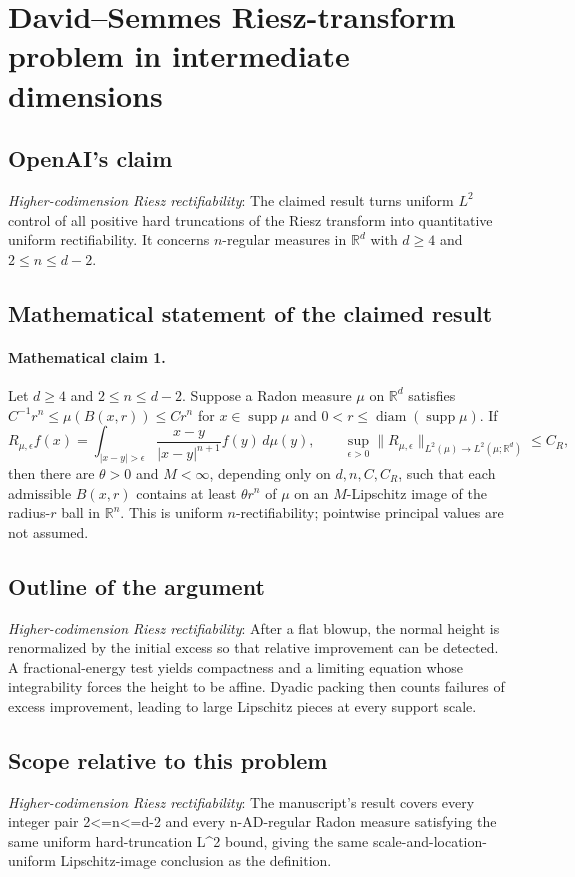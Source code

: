 \documentclass[11pt]{article}
\begin{document}
\section*{David–Semmes Riesz-transform problem in intermediate dimensions}

\subsection{OpenAI's claim}
\textit{Higher-codimension Riesz rectifiability}: The claimed result turns uniform $L^2$ control of all positive hard truncations of the Riesz transform into quantitative uniform rectifiability. It concerns $n$-regular measures in $\mathbb R^d$ with $d\ge4$ and $2\le n\le d-2$.

\subsection{Mathematical statement of the claimed result}
\paragraph{Mathematical claim 1.} Let $d\ge4$ and $2\le n\le d-2$. Suppose a Radon measure $\mu$ on $\mathbb R^d$ satisfies $C^{-1}r^n\le\mu(B(x,r))\le Cr^n$ for $x\in\operatorname{supp}\mu$ and $0<r\le\operatorname{diam}(\operatorname{supp}\mu)$. If \[R_{\mu,\epsilon}f(x)=\int_{|x-y|>\epsilon}\frac{x-y}{|x-y|^{n+1}}f(y)\,d\mu(y),\qquad\sup_{\epsilon>0}\|R_{\mu,\epsilon}\|_{L^2(\mu)\to L^2(\mu;\mathbb R^d)}\le C_R,\] then there are $\theta>0$ and $M<\infty$, depending only on $d,n,C,C_R$, such that each admissible $B(x,r)$ contains at least $\theta r^n$ of $\mu$ on an $M$-Lipschitz image of the radius-$r$ ball in $\mathbb R^n$. This is uniform $n$-rectifiability; pointwise principal values are not assumed.

\subsection{Outline of the argument}
\textit{Higher-codimension Riesz rectifiability}: After a flat blowup, the normal height is renormalized by the initial excess so that relative improvement can be detected. A fractional-energy test yields compactness and a limiting equation whose integrability forces the height to be affine. Dyadic packing then counts failures of excess improvement, leading to large Lipschitz pieces at every support scale.

\subsection{Scope relative to this problem}
\textit{Higher-codimension Riesz rectifiability}: The manuscript’s result covers every integer pair 2<=n<=d-2 and every n-AD-regular Radon measure satisfying the same uniform hard-truncation L\textasciicircum{}2 bound, giving the same scale-and-location-uniform Lipschitz-image conclusion as the definition.
\end{document}
